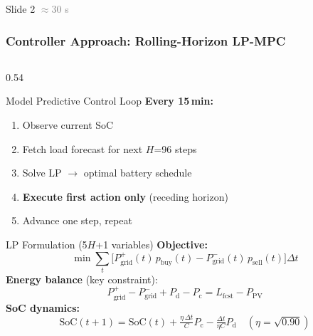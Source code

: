 \documentclass[aspectratio=169, 10pt]{beamer}
\newcommand{\Dt}{\Delta t}
\begin{document}
\begin{frame}{Slide 2 \hfill \textcolor{gray}{\small$\approx$30 s}}
  \frametitle{Controller Approach: Rolling-Horizon LP-MPC}

  \begin{columns}[T]
    \begin{column}{0.54\textwidth}
      \begin{block}{Model Predictive Control Loop}
        \small
        \textbf{Every 15\,min:}
        \begin{enumerate}
          \item Observe current SoC
          \item Fetch load forecast for next $H$=96 steps
          \item Solve LP $\rightarrow$ optimal battery schedule
          \item \textbf{Execute first action only} (receding horizon)
          \item Advance one step, repeat
        \end{enumerate}
      \end{block}

      \vspace{4pt}
      \begin{block}{LP Formulation (5$H$+1 variables)}
        \footnotesize
        \textbf{Objective:}
        \[
          \min \sum_{t}\bigl[P_{\text{grid}}^+(t)\,p_{\text{buy}}(t)
                              - P_{\text{grid}}^-(t)\,p_{\text{sell}}(t)\bigr]\Dt
        \]
        \textbf{Energy balance} (key constraint):
        \[
          P_{\text{grid}}^+ - P_{\text{grid}}^- + P_{\text{d}} - P_{\text{c}}
          = L_{\text{fcst}} - P_{\text{PV}}
        \]
        \textbf{SoC dynamics:}
        \[
          \text{SoC}(t{+}1) = \text{SoC}(t)
            + \tfrac{\eta\,\Dt}{C}P_{\text{c}}
            - \tfrac{\Dt}{\eta C}P_{\text{d}}
          \quad (\eta = \sqrt{0.90})
        \]
      \end{block}
    \end{column}


\end{columns}
\end{frame}
\end{document}
